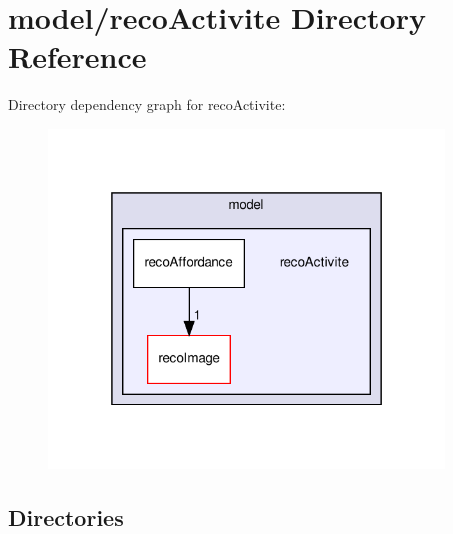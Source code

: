 \section{model/reco\+Activite Directory Reference}
\label{dir_62834f59ae7dae1faae8057cc420622b}
Directory dependency graph for reco\+Activite\+:
\nopagebreak
\begin{figure}[H]
\begin{center}
\leavevmode
\includegraphics[width=298pt]{dir_62834f59ae7dae1faae8057cc420622b_dep}
\end{center}
\end{figure}
\subsection*{Directories}
\begin{DoxyCompactItemize}
\end{DoxyCompactItemize}
